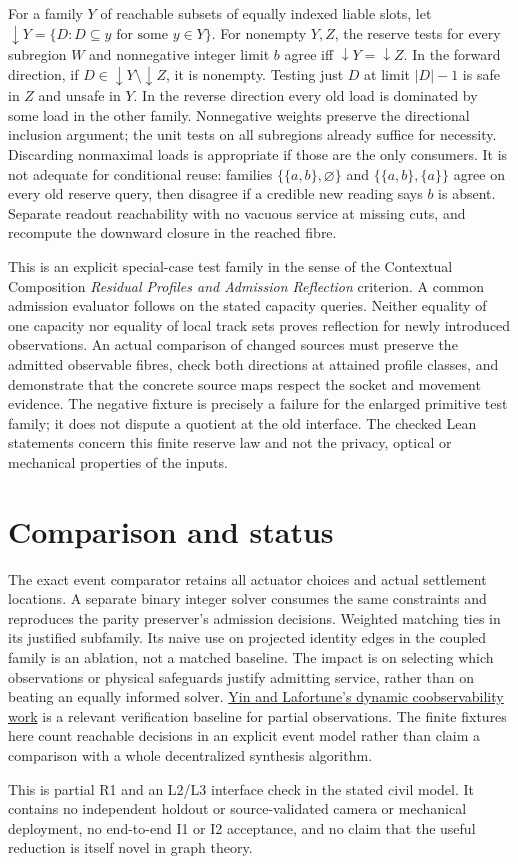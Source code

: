 \documentclass[11pt]{article}
\begin{document}
For a family \(Y\) of reachable subsets of equally indexed liable slots,
let \(\downarrow Y=\{D:D\subseteq y\text{ for some }y\in Y\}\). For
nonempty \(Y,Z\), the reserve tests for every subregion \(W\) and nonnegative
integer limit \(b\) agree iff \(\downarrow Y=\downarrow Z\). In the forward
direction, if \(D\in\downarrow Y\setminus\downarrow Z\), it is nonempty.
Testing just \(D\) at limit \(|D|-1\) is safe in \(Z\) and unsafe in \(Y\).
In the reverse direction every old load is dominated by some load in the
other family. Nonnegative weights preserve the directional inclusion
argument; the unit tests on all subregions already suffice for necessity.
Discarding nonmaximal loads is appropriate if those are the only
consumers. It is not adequate for conditional reuse: families
\(\{\{a,b\},\varnothing\}\) and \(\{\{a,b\},\{a\}\}\) agree on every old
reserve query, then disagree if a credible new reading says \(b\) is
absent. Separate readout reachability with no vacuous service at missing
cuts, and recompute the downward closure in the reached fibre.

This is an explicit special-case test family in the sense of the
Contextual Composition \emph{Residual Profiles and Admission Reflection}
criterion. A common admission evaluator follows on the stated capacity
queries. Neither equality of one capacity nor equality of local track
sets proves reflection for newly introduced observations. An actual
comparison of changed sources must preserve the admitted observable
fibres, check both directions at attained profile classes, and demonstrate
that the concrete source maps respect the socket and movement evidence.
The negative fixture is precisely a failure for the enlarged primitive
test family; it does not dispute a quotient at the old interface.
The checked Lean statements concern this finite reserve law and not the
privacy, optical or mechanical properties of the inputs.

\section{Comparison and status}

The exact event comparator retains all actuator choices and actual
settlement locations. A separate binary integer solver consumes the same
constraints and reproduces the parity preserver's admission decisions.
Weighted matching ties in its justified subfamily. Its naive use on
projected identity edges in the coupled family is an ablation, not a
matched baseline. The impact is on selecting which observations or
physical safeguards justify admitting service, rather than on beating
an equally informed solver.
\href{https://www.sciencedirect.com/science/article/pii/S0005109815003490}{Yin and
Lafortune's dynamic coobservability work} is a relevant verification
baseline for partial observations. The finite fixtures here count
reachable decisions in an explicit event model rather than claim a
comparison with a whole decentralized synthesis algorithm.

This is partial R1 and an L2/L3 interface check in the stated civil model.
It contains no independent holdout or source-validated camera or
mechanical deployment, no end-to-end I1 or I2 acceptance, and no claim
that the useful reduction is itself novel in graph theory.
\end{document}

